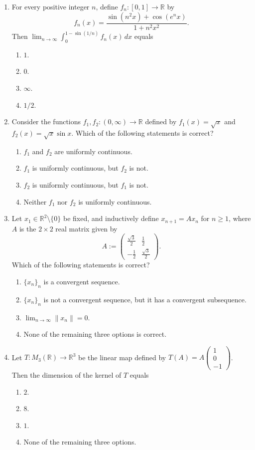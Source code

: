 \documentclass[11pt, a4paper]{article}
\begin{document}
\begin{enumerate}
  \item For every positive integer $n$, define $f_n: [0,1] \to \mathbb{R}$ by
  \[
    f_n(x) = \frac{\sin(n^2 x) + \cos(e^n x)}{1 + n^2 x^2}.
  \]
  Then $\displaystyle \lim_{n \to \infty} \int_0^{1 - \sin(1/n)} f_n(x)\,dx$ equals
  \begin{enumerate}[label=(\alph*)]
    \item $1$.
    \item $0$.
    \item $\infty$.
    \item $1/2$.
  \end{enumerate}

  \item Consider the functions $f_1, f_2: (0,\infty) \to \mathbb{R}$ defined by $f_1(x) = \sqrt{x}$ and $f_2(x) = \sqrt{x} \sin x$. Which of the following statements is correct?
  \begin{enumerate}[label=(\alph*)]
    \item $f_1$ and $f_2$ are uniformly continuous.
    \item $f_1$ is uniformly continuous, but $f_2$ is not.
    \item $f_2$ is uniformly continuous, but $f_1$ is not.
    \item Neither $f_1$ nor $f_2$ is uniformly continuous.
  \end{enumerate}

  \item Let $x_1 \in \mathbb{R}^2 \setminus \{0\}$ be fixed, and inductively define $x_{n+1} = A x_n$ for $n \ge 1$, where $A$ is the $2 \times 2$ real matrix given by
  \[
    A := \begin{pmatrix} \frac{\sqrt{3}}{2} & \frac{1}{2} \\ -\frac{1}{2} & \frac{\sqrt{3}}{2} \end{pmatrix}.
  \]
  Which of the following statements is correct?
  \begin{enumerate}[label=(\alph*)]
    \item $\{x_n\}_n$ is a convergent sequence.
    \item $\{x_n\}_n$ is not a convergent sequence, but it has a convergent subsequence.
    \item $\lim_{n \to \infty} \|x_n\| = 0$.
    \item None of the remaining three options is correct.
  \end{enumerate}

  \item Let $T: M_3(\mathbb{R}) \to \mathbb{R}^3$ be the linear map defined by $T(A) = A \begin{pmatrix} 1 \\ 0 \\ -1 \end{pmatrix}$. Then the dimension of the kernel of $T$ equals
  \begin{enumerate}[label=(\alph*)]
    \item $2$.
    \item $8$.
    \item $1$.
    \item None of the remaining three options.
  \end{enumerate}


\end{enumerate}
\end{document}
